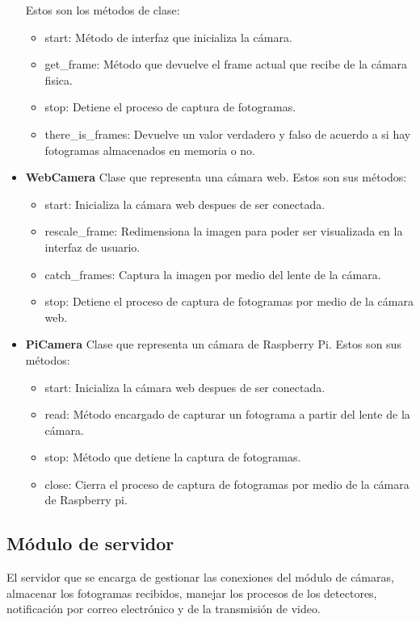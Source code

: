 \begin{itemize}
\begin{itemize}
        \end{itemize}
        Estos son los métodos de clase:
        \begin{itemize}
            \item start: Método de interfaz que inicializa la cámara.
            \item get\_frame: Método que devuelve el frame actual que recibe de la cámara fisica.
            \item stop: Detiene el proceso de captura de fotogramas.
            \item there\_is\_frames: Devuelve un valor verdadero y falso de acuerdo a si hay fotogramas almacenados en memoria o no.
        \end{itemize}
    \item \textbf{WebCamera} Clase que representa una cámara web. Estos son sus métodos:
        \begin{itemize}
            \item start: Inicializa la cámara web despues de ser conectada.
            \item rescale\_frame: Redimensiona la imagen para poder ser visualizada en la interfaz de usuario.
            \item catch\_frames: Captura la imagen por medio del lente de la cámara.
            \item stop: Detiene el proceso de captura de fotogramas por medio de la cámara web.
        \end{itemize}
    \item \textbf{PiCamera} Clase que representa un cámara de Raspberry Pi. Estos son sus métodos:
        \begin{itemize}
            \item start: Inicializa la cámara web despues de ser conectada.
            \item read: Método encargado de capturar un fotograma a partir del lente de la cámara.
            \item stop: Método que detiene la captura de fotogramas.
            \item close: Cierra el proceso de captura de fotogramas por medio de la cámara de Raspberry pi.
        \end{itemize}
\end{itemize}

\subsection{Módulo de servidor}
El servidor que se encarga  de gestionar las conexiones del módulo de cámaras, almacenar los fotogramas recibidos, manejar los procesos de los detectores, notificación por correo electrónico y de la transmisión de video.\\

